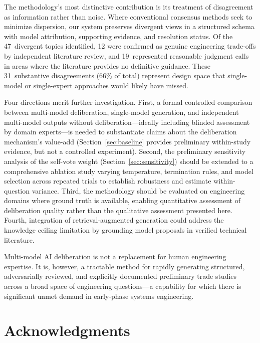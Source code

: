 \documentclass[11pt,a4paper]{article}
\begin{document}
The methodology's most distinctive contribution is its treatment of disagreement as information rather than noise. Where conventional consensus methods seek to minimize dispersion, our system preserves divergent views in a structured schema with model attribution, supporting evidence, and resolution status. Of the 47~divergent topics identified, 12 were confirmed as genuine engineering trade-offs by independent literature review, and 19~represented reasonable judgment calls in areas where the literature provides no definitive guidance. These 31~substantive disagreements (66\% of total) represent design space that single-model or single-expert approaches would likely have missed.

Four directions merit further investigation. First, a formal controlled comparison between multi-model deliberation, single-model generation, and independent multi-model outputs without deliberation---ideally including blinded assessment by domain experts---is needed to substantiate claims about the deliberation mechanism's value-add (Section~\ref{sec:baseline} provides preliminary within-study evidence, but not a controlled experiment). Second, the preliminary sensitivity analysis of the self-vote weight (Section~\ref{sec:sensitivity}) should be extended to a comprehensive ablation study varying temperature, termination rules, and model selection across repeated trials to establish robustness and estimate within-question variance. Third, the methodology should be evaluated on engineering domains where ground truth is available, enabling quantitative assessment of deliberation quality rather than the qualitative assessment presented here. Fourth, integration of retrieval-augmented generation could address the knowledge ceiling limitation by grounding model proposals in verified technical literature.

Multi-model AI deliberation is not a replacement for human engineering expertise. It is, however, a tractable method for rapidly generating structured, adversarially reviewed, and explicitly documented preliminary trade studies across a broad space of engineering questions---a capability for which there is significant unmet demand in early-phase systems engineering.

\section*{Acknowledgments}
\end{document}
